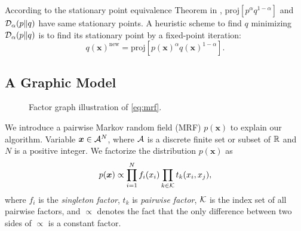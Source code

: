 \documentclass{article}
\begin{document}
According to the stationary point equivalence Theorem in \cite{divergence-measures-and-message-passing}, $\text{proj}[p^{\alpha}q^{1- \alpha}]$ and $\mathcal{D}_{\alpha}(p\|q)$ have same stationary points. A heuristic scheme to find $q$ minimizing $\mathcal{D}_{\alpha}(p\|q)$ is to find its stationary point by a fixed-point iteration:
\begin{equation}\label{eq:fixed-point-iter}
  q(\bm{x})^{\text{new}}  = \text{proj}[p(\bm{x})^{\alpha}q(\bm{x})^{1-\alpha}].
\end{equation}

\subsection{A Graphic Model}

\begin{figure}
  \begin{centering}
    \caption{Factor graph illustration of \autoref{eq:mrf}.}\label{fig:factor-graph}
    \vspace{0.1cm}
  \end{centering}
\end{figure}
We introduce a pairwise Markov random field (MRF) $p(\bm{x})$ to explain our algorithm. Variable $\bm{x} \in \mathcal{A}^N$, where $\mathcal{A}$ is a discrete finite set or subset of $\mathbb{R}$ and $N$ is a positive integer. We factorize the distribution $p(\bm{x})$ as
\begin{equation}\label{eq:mrf}
  p(\bm{x}) \propto \prod_{{i=1}}^{N} f_i(x_i) \prod_{k \in \mathcal{K}} t_k(x_i, x_j),
\end{equation}
where $f_i$ is the \textit{singleton factor}, $t_k$ is \textit{pairwise factor}, $\mathcal{K}$ is the index set of all pairwise factors, and $\propto$ denotes the fact that the only difference between two sides of $\propto$ is a constant factor.
\end{document}
